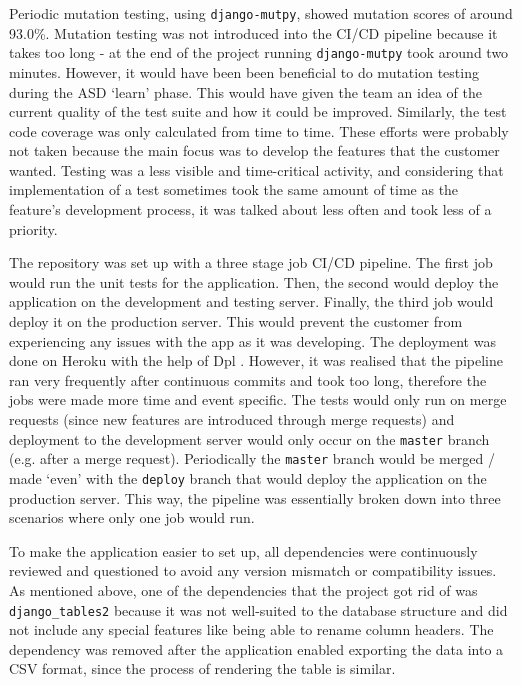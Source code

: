 \documentclass{l3proj}
\begin{document}
Periodic mutation testing, using \texttt{django-mutpy}, showed mutation scores of around 93.0\%. Mutation testing was not introduced into the CI/CD pipeline because it takes too long - at the end of the project running \texttt{django-mutpy} took around two minutes. However, it would have been been beneficial to do mutation testing during the ASD `learn' phase. This would have given the team an idea of the current quality of the test suite and how it could be improved. Similarly, the test code coverage was only calculated from time to time. These efforts were probably not taken because the main focus was to develop the features that the customer wanted. Testing was a less visible and time-critical activity, and considering that implementation of a test sometimes took the same amount of time as the feature's development process, it was talked about less often \cite{Testing} and took less of a priority.

The repository was set up with a three stage job CI/CD pipeline. The first job would run the unit tests for the application. Then, the second would deploy the application on the development and testing server. Finally, the third job would deploy it on the production server. This would prevent the customer from experiencing any issues with the app as it was developing. 
The deployment was done on Heroku with the help of Dpl \cite{gitlabdpl}. However, it was realised that the pipeline ran very frequently after continuous commits and took too long, therefore the jobs were made more time and event specific. The tests would only run on merge requests (since new features are introduced through merge requests) and deployment to the development server would only occur on the \texttt{master} branch (e.g. after a merge request). Periodically the \texttt{master} branch would be merged / made `even' with the \texttt{deploy} branch that would deploy the application on the production server. This way, the pipeline was essentially broken down into three scenarios where only one job would run.

To make the application easier to set up, all dependencies were continuously reviewed and questioned to avoid any version mismatch or compatibility issues.
As mentioned above, one of the dependencies that the project got rid of was \texttt{django\_tables2} because it was not well-suited to the database structure and did not include any special features like being able to rename column headers. The dependency was removed after the application enabled exporting the data into a CSV format, since the process of rendering the table is similar. 
\end{document}
